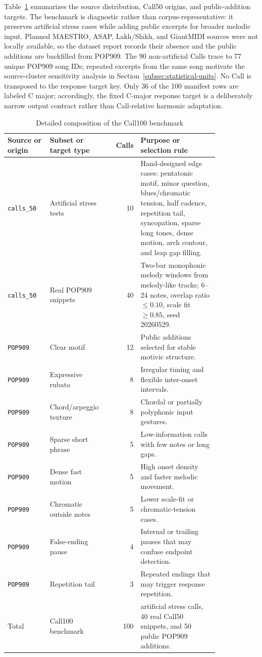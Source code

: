 \documentclass[11pt,a4paper]{article}
\begin{document}
Table~\ref{tab:call100-dataset} summarizes the source distribution, Call50 origins, and public-addition targets. The benchmark is diagnostic rather than corpus-representative: it preserves artificial stress cases while adding public excerpts for broader melodic input. Planned MAESTRO, ASAP, Lakh/Slakh, and GiantMIDI sources were not locally available, so the dataset report records their absence and the public additions are backfilled from POP909. The 90 non-artificial Calls trace to 77 unique POP909 song IDs; repeated excerpts from the same song motivate the source-cluster sensitivity analysis in Section~\ref{subsec:statistical-units}. No Call is transposed to the response target key. Only 36 of the 100 manifest rows are labeled C major; accordingly, the fixed C-major response target is a deliberately narrow output contract rather than Call-relative harmonic adaptation.

\begin{table}[htbp]
\centering
\caption{Detailed composition of the Call100 benchmark}
\label{tab:call100-dataset}
\small
\begin{tabular}{>{\raggedright\arraybackslash}p{0.20\linewidth}>{\raggedright\arraybackslash}p{0.26\linewidth}r>{\raggedright\arraybackslash}p{0.37\linewidth}}
\toprule
Source or origin & Subset or target type & Calls & Purpose or selection rule \\
\midrule
\texttt{calls\_50} & Artificial stress tests & 10 & Hand-designed edge cases: pentatonic motif, minor question, blues/chromatic tension, half cadence, repetition tail, syncopation, sparse long tones, dense motion, arch contour, and leap gap filling. \\
\texttt{calls\_50} & Real POP909 snippets & 40 & Two-bar monophonic melody windows from melody-like tracks; 6--24 notes, overlap ratio $\leq 0.10$, scale fit $\geq 0.85$, seed 20260529. \\
\midrule
\texttt{POP909} & Clear motif & 12 & Public additions selected for stable motivic structure. \\
\texttt{POP909} & Expressive rubato & 8 & Irregular timing and flexible inter-onset intervals. \\
\texttt{POP909} & Chord/arpeggio texture & 8 & Chordal or partially polyphonic input gestures. \\
\texttt{POP909} & Sparse short phrase & 5 & Low-information calls with few notes or long gaps. \\
\texttt{POP909} & Dense fast motion & 5 & High onset density and faster melodic movement. \\
\texttt{POP909} & Chromatic outside notes & 5 & Lower scale-fit or chromatic-tension cases. \\
\texttt{POP909} & False-ending pause & 4 & Internal or trailing pauses that may confuse endpoint detection. \\
\texttt{POP909} & Repetition tail & 3 & Repeated endings that may trigger response repetition. \\
\midrule
Total & Call100 benchmark & 100 & 10 artificial stress calls, 40 real Call50 snippets, and 50 public POP909 additions. \\
\bottomrule
\end{tabular}
\end{table}
\end{document}
